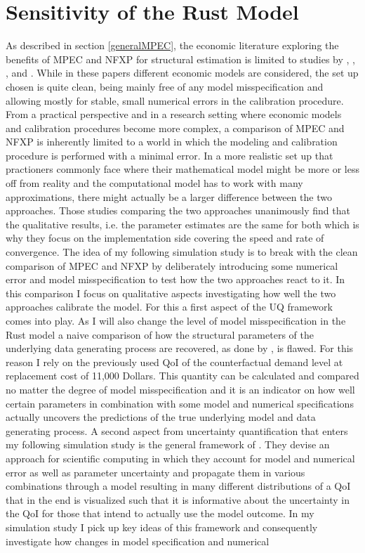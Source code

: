\section{Sensitivity of the Rust Model}
\thispagestyle{plain} %

As described in section \ref{generalMPEC}, the economic literature exploring the benefits of MPEC and NFXP for structural estimation is limited to studies by \cite{Su.Judd.2012}, \cite{Dube.Fox.Su.2012}, \cite{Jorgensen.2013}, \cite{Iskhakov.2016} and \cite{Dong.Hsieh.Zhang.2017}. While in these papers different economic models are considered, the set up chosen is quite clean, being mainly free of any model misspecification and allowing mostly for stable, small numerical errors in the calibration procedure. From a practical perspective and in a research setting where economic models and calibration procedures become more complex, a comparison of MPEC and NFXP is inherently limited to a world in which the modeling and calibration procedure is performed with a minimal error. In a more realistic set up that practioners commonly face where their mathematical model might be more or less off from reality and the computational model has to work with many approximations, there might actually be a larger difference between the two approaches. Those studies comparing the two approaches unanimously find that the qualitative results, i.e. the parameter estimates are the same for both which is why they focus on the implementation side covering the speed and rate of convergence. The idea of my following simulation study is to break with the clean comparison of MPEC and NFXP by deliberately introducing some numerical error and model misspecification to test how the two approaches react to it. In this comparison I focus on qualitative aspects investigating how well the two approaches calibrate the model. For this a first aspect of the UQ framework comes into play. As I will also change the level of model misspecification in the Rust model a naive comparison of how the structural parameters of the underlying data generating process are recovered, as done by \cite{Su.Judd.2012}, is flawed. For this reason I rely on the previously used QoI of the counterfactual demand level at replacement cost of 11,000 Dollars. This quantity can be calculated and compared no matter the degree of model misspecification and it is an indicator on how well certain parameters in combination with some model and numerical specifications actually uncovers the predictions of the true underlying model and data generating process. A second aspect from uncertainty quantification that enters my following simulation study is the general framework of \cite{Oberkampf.2010}. They devise an approach for scientific computing in which they account for model and numerical error as well as parameter uncertainty and propagate them in various combinations through a model resulting in many different distributions of a QoI that in the end is visualized such that it is informative about the uncertainty in the QoI for those that intend to actually use the model outcome. In my simulation study I pick up key ideas of this framework and consequently investigate how changes in model specification and numerical 